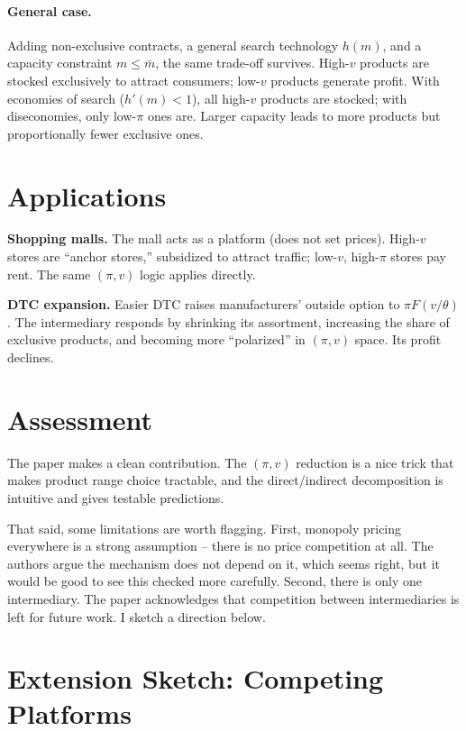 \documentclass[11pt]{article}
\begin{document}
\paragraph{General case.} Adding non-exclusive contracts, a general search technology $h(m)$, and a capacity constraint $m \leq \bar{m}$, the same trade-off survives. High-$v$ products are stocked exclusively to attract consumers; low-$v$ products generate profit. With economies of search ($h'(m) < 1$), all high-$v$ products are stocked; with diseconomies, only low-$\pi$ ones are. Larger capacity leads to more products but proportionally fewer exclusive ones.

\section*{Applications}

\textbf{Shopping malls.} The mall acts as a platform (does not set prices). High-$v$ stores are ``anchor stores,'' subsidized to attract traffic; low-$v$, high-$\pi$ stores pay rent. The same $(\pi, v)$ logic applies directly.

\textbf{DTC expansion.} Easier DTC raises manufacturers' outside option to $\pi F(v/\theta)$. The intermediary responds by shrinking its assortment, increasing the share of exclusive products, and becoming more ``polarized'' in $(\pi, v)$ space. Its profit declines.

\section*{Assessment}

The paper makes a clean contribution. The $(\pi, v)$ reduction is a nice trick that makes product range choice tractable, and the direct/indirect decomposition is intuitive and gives testable predictions.

That said, some limitations are worth flagging. First, monopoly pricing everywhere is a strong assumption -- there is no price competition at all. The authors argue the mechanism does not depend on it, which seems right, but it would be good to see this checked more carefully. Second, there is only one intermediary. The paper acknowledges that competition between intermediaries is left for future work. I sketch a direction below.

\section*{Extension Sketch: Competing Platforms}
\end{document}

